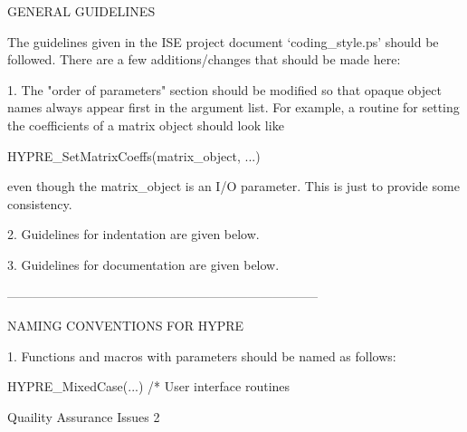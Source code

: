 \documentclass{article}
\begin{document}
\begin{cxxentry}
\begin{cxxentry}
\begin{cxxdoc}
GENERAL GUIDELINES

The guidelines given in the ISE project document `coding_style.ps'
should be followed.  There are a few additions/changes that should
be made here:

1. The "order of parameters" section should be modified so that
opaque object names always appear first in the argument list.
For example, a routine for setting the coefficients of a matrix
object should look like

HYPRE_SetMatrixCoeffs(matrix_object, ...)

even though the matrix_object is an I/O parameter.  This is
just to provide some consistency.

2. Guidelines for indentation are given below.

3. Guidelines for documentation are given below.

--------------------------------------------------------------------------

NAMING CONVENTIONS FOR HYPRE


1. Functions and macros with parameters should be named as follows:

HYPRE_MixedCase(...)          /* User interface routines 
\end{cxxdoc}
\end{cxxentry}
\end{cxxentry}
\begin{cxxentry}
{}
        {Quaility Assurance Issues}
        {}
        {}
        {2}
\end{cxxentry}
\end{document}
